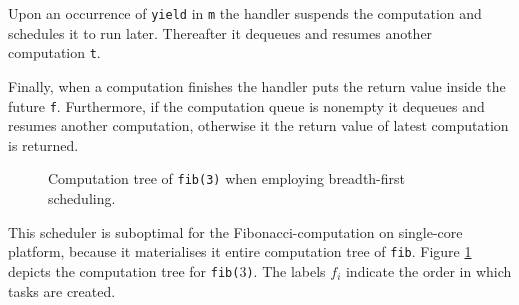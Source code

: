 \documentclass[preprint,10pt,numbers]{sigplanconf}
\begin{document}
Upon an occurrence of \texttt{yield} in \texttt{m} the handler suspends the computation and schedules it to run later. Thereafter it dequeues and resumes another computation \texttt{t}.

Finally, when a computation finishes the handler puts the return value inside the future \texttt{f}. Furthermore, if the computation queue is nonempty it dequeues and resumes another computation, otherwise it the return value of latest computation is returned.
\begin{figure}
\begin{center}
\caption{Computation tree of \texttt{fib(3)} when employing breadth-first scheduling.}\label{fig:bfs}
\end{center}
\end{figure}

This scheduler is suboptimal for the Fibonacci-computation on single-core platform, because it materialises it entire computation tree of \texttt{fib}. Figure \ref{fig:bfs} depicts the computation tree for \texttt{fib($3$)}. The labels $f_i$ indicate the order in which tasks are created.
\end{document}
